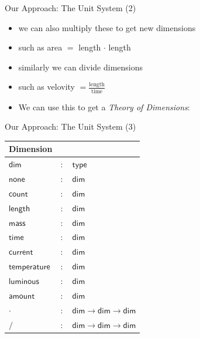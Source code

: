 \documentclass{beamer}
\begin{document}
  \begin{frame}{Our Approach: The Unit System (2)}
    \begin{itemize}[<+->]
      \item we can also multiply these to get new dimensions
      \item such as area $=$ length $\cdot{}$ length
      \item similarly we can divide dimensions
      \item such as velovity $= \frac{\text{length}}{\text{time}}$
      \item We can use this to get a \textit{Theory of Dimensions}:
    \end{itemize}
  \end{frame}
  \begin{frame}{Our Approach: The Unit System (3)}
    \begin{center}
      \begin{tabular}{|l l l|}
        \hline
        \textsf{Dimension} & &\\\hline
        $\mathsf{dim}$ & $:$ & $ \mathsf{type}$\\

        $\mathsf{none}$ & $:$ & $ \mathsf{dim}$\\
        $\mathsf{count}$ & $:$ & $ \mathsf{dim}$\\
        $\mathsf{length}$ & $:$ & $ \mathsf{dim}$\\
        $\mathsf{mass}$ & $:$ & $ \mathsf{dim}$\\
        $\mathsf{time}$ & $:$ & $ \mathsf{dim}$\\
        $\mathsf{current}$ & $:$ & $ \mathsf{dim}$\\
        $\mathsf{temperature}$ & $:$ & $ \mathsf{dim}$\\
        $\mathsf{luminous}$ & $:$ & $ \mathsf{dim}$\\
        $\mathsf{amount}$ & $:$ & $ \mathsf{dim}$\\

        $\cdot{}$ & $:$ & $ \mathsf{dim} \rightarrow \mathsf{dim} \rightarrow \mathsf{dim}$\\
        $/$ & $:$ & $ \mathsf{dim} \rightarrow \mathsf{dim} \rightarrow \mathsf{dim}$\\\hline
      \end{tabular}
  \end{center}
\end{frame}
\end{document}
